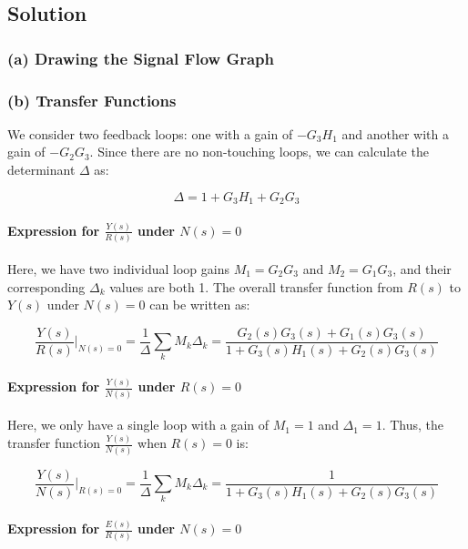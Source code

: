 \documentclass{article}
\begin{document}
\subsection*{Solution}
\subsubsection*{(a) Drawing the Signal Flow Graph}
\newline
\begin{figure}[htbp]
  \centering
  
\end{figure}
\newpage
\subsubsection*{(b) Transfer Functions}

We consider two feedback loops: one with a gain of \(-G_3H_1\) and another with a gain of \(-G_2G_3\). Since there are no non-touching loops, we can calculate the determinant \(\Delta\) as:

\[
\Delta = 1 + G_3H_1 + G_2G_3
\]

\paragraph{Expression for \( \frac{Y(s)}{R(s)} \) under \( N(s) = 0 \)}

Here, we have two individual loop gains \(M_1 = G_2G_3\) and \(M_2 = G_1G_3\), and their corresponding \(\Delta_k\) values are both 1. The overall transfer function from \( R(s) \) to \( Y(s) \) under \( N(s) = 0 \) can be written as:

\[
\frac{Y(s)}{R(s)} \bigg|_{N(s) = 0} = \frac{1}{\Delta} \sum_k M_k \Delta_k = \frac{G_2(s)G_3(s) + G_1(s)G_3(s)}{1 + G_3(s)H_1(s) + G_2(s)G_3(s)}
\]

\paragraph{Expression for \( \frac{Y(s)}{N(s)} \) under \( R(s) = 0 \)}

Here, we only have a single loop with a gain of \(M_1 = 1\) and \(\Delta_1 = 1\). Thus, the transfer function \( \frac{Y(s)}{N(s)} \) when \( R(s) = 0 \) is:

\[
\frac{Y(s)}{N(s)} \bigg|_{R(s) = 0} = \frac{1}{\Delta} \sum_k M_k \Delta_k = \frac{1}{1 + G_3(s)H_1(s) + G_2(s)G_3(s)}
\]

\paragraph{Expression for \( \frac{E(s)}{R(s)} \) under \( N(s) = 0 \)}
\end{document}
